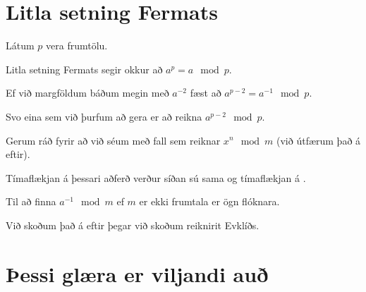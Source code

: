 \section{Litla setning Fermats}
{
    {
        \item<1-> Látum $p$ vera frumtölu.
        \item<2-> Litla setning Fermats segir okkur að $a^p = a \mod p$.
        \item<3-> Ef við margföldum báðum megin með $a^{-2}$ fæst að $a^{p - 2} = a^{-1} \mod p$.
        \item<4-> Svo eina sem við þurfum að gera er að reikna $a^{p - 2} \mod p$.
        \item<5-> Gerum ráð fyrir að við séum með fall  sem reiknar $x^n \mod m$ (við útfærum það á eftir).
        \item<6->[] 
        \item<7-> Tímaflækjan á þessari aðferð verður síðan sú sama og tímaflækjan á .
    }
}

{
    {
        \item<1-> Til að finna $a^{-1} \mod m$ ef $m$ er ekki frumtala er ögn flóknara.
        \item<2-> Við skoðum það á eftir þegar við skoðum reiknirit Evklíðs.
    }
}

\section{Þessi glæra er viljandi auð}
{
}


